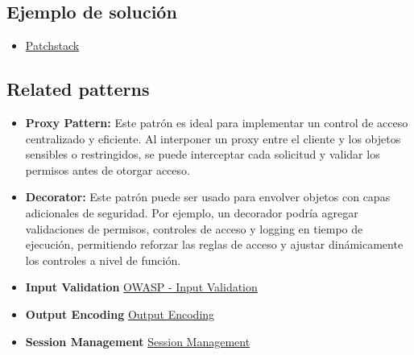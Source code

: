 \subsection{Ejemplo de solución}

\begin{itemize}
    \item \href{https://patchstack.com/academy/wordpress/securing-code/broken-access-control/}{Patchstack}
\end{itemize}

\subsection{Related patterns}

\begin{itemize} 
\item \textbf{Proxy Pattern: }Este patrón es ideal para implementar un control de acceso centralizado y eficiente. Al interponer un proxy entre el cliente y los objetos sensibles o restringidos, se puede interceptar cada solicitud y validar los permisos antes de otorgar acceso.
\item \textbf{Decorator: }Este patrón puede ser usado para envolver objetos con capas adicionales de seguridad. Por ejemplo, un decorador podría agregar validaciones de permisos, controles de acceso y logging en tiempo de ejecución, permitiendo reforzar las reglas de acceso y ajustar dinámicamente los controles a nivel de función.
\item \textbf{Input Validation} 
\href{https://cheatsheetseries.owasp.org/cheatsheets/Input_Validation_Cheat_Sheet.html}{OWASP - Input Validation}
\item \textbf{Output Encoding}
\href{https://qwiet.ai/appsec-101-output-encoding/}{Output Encoding}
\item \textbf{Session Management}
\href{https://cheatsheetseries.owasp.org/cheatsheets/Session_Management_Cheat_Sheet.html}{Session Management}
\end{itemize}